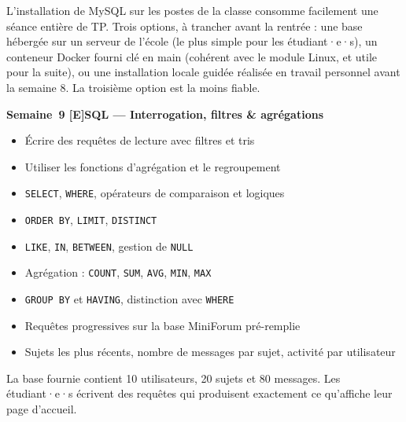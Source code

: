 \documentclass[a4paper,11pt]{article}
\newcommand{\semainetitre}[4]{%
  \needspace{9\baselineskip}%
  \vspace{8pt}
  \noindent
  \begin{tcolorbox}[
    enhanced, colback=cfptBlack, colframe=cfptBlack,
    boxrule=0pt, arc=3pt, boxsep=0pt,
    left=8pt, right=90pt, top=4pt, bottom=4pt,
    overlay={%
      \node[anchor=east, fill=cfptYellow, text=cfptBlack,
            rounded corners=2pt, inner xsep=6pt, inner ysep=3pt,
            font=\scriptsize\bfseries]
        at ([xshift=-6pt]frame.east) {#3};}
  ]
  \color{white}\bfseries\small Semaine~#1 \quad\textcolor{cfptYellow}{[#4]}\quad #2
  \end{tcolorbox}
  \vspace{-4pt}
}
\newcommand{\contenutitre}[1]{%
  \vspace{4pt}
  \noindent{\small\color{accentBlue}\textbf{#1}}\vspace{2pt}
}
\begin{document}
\begin{tcolorbox}[alerte, title={Point d'organisation --- installation de MySQL}]
\small
L'installation de MySQL sur les postes de la classe consomme facilement une séance entière de TP. Trois options, à trancher avant la rentrée : une base hébergée sur un serveur de l'école (le plus simple pour les étudiant·e·s), un conteneur Docker fourni clé en main (cohérent avec le module Linux, et utile pour la suite), ou une installation locale guidée réalisée en travail personnel avant la semaine 8. La troisième option est la moins fiable.
\end{tcolorbox}

\newpage

\semainetitre{9}{SQL --- Interrogation, filtres \& agrégations}{3h cours / 4h TP}{E}
\begin{tcolorbox}[semaine]
\begin{tcolorbox}[objectifs]
\begin{itemize}
  \item Écrire des requêtes de lecture avec filtres et tris
  \item Utiliser les fonctions d'agrégation et le regroupement
\end{itemize}
\end{tcolorbox}
\vspace{4pt}
\contenutitre{Cours}
\begin{itemize}
  \item \texttt{SELECT}, \texttt{WHERE}, opérateurs de comparaison et logiques
  \item \texttt{ORDER BY}, \texttt{LIMIT}, \texttt{DISTINCT}
  \item \texttt{LIKE}, \texttt{IN}, \texttt{BETWEEN}, gestion de \texttt{NULL}
  \item Agrégation : \texttt{COUNT}, \texttt{SUM}, \texttt{AVG}, \texttt{MIN}, \texttt{MAX}
  \item \texttt{GROUP BY} et \texttt{HAVING}, distinction avec \texttt{WHERE}
\end{itemize}
\contenutitre{Travaux pratiques}
\begin{itemize}
  \item Requêtes progressives sur la base MiniForum pré-remplie
  \item Sujets les plus récents, nombre de messages par sujet, activité par utilisateur
\end{itemize}
\end{tcolorbox}
\begin{tcolorbox}[filrouge={Interroger les vraies données}]
\small La base fournie contient 10 utilisateurs, 20 sujets et 80 messages. Les étudiant·e·s écrivent des requêtes qui produisent exactement ce qu'affiche leur page d'accueil.
\end{tcolorbox}
\end{document}
